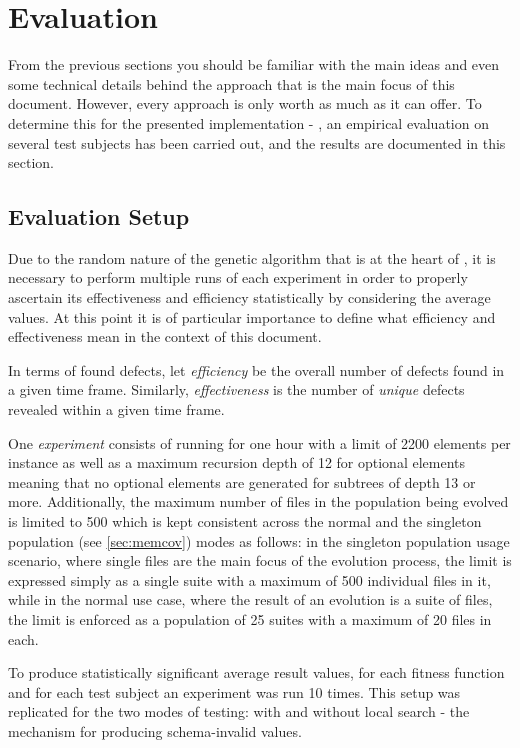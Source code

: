 \section{Evaluation}
\label{sec:evaluation}
From the previous sections you should be familiar with the main ideas and even some technical details behind
the approach that is the main focus of this document. However, every approach is only worth as much as it can
offer. To determine this for the presented implementation - \xmlmate, an empirical evaluation on several test
subjects has been carried out, and the results are documented in this section.
\subsection{Evaluation Setup}

Due to the random nature of the genetic algorithm that is at the heart of \xmlmate, it is necessary to perform
multiple runs of each experiment in order to properly ascertain its effectiveness and efficiency statistically
by considering the average values. At this point it is of particular importance to define what efficiency and
effectiveness mean in the context of this document. 

In terms of found defects, let \emph{efficiency} be the overall number of defects found in a given time frame.
Similarly, \emph{effectiveness} is the number of \emph{unique} defects revealed within a given time frame.

One \emph{experiment} consists of running \xmlmate for one hour with a limit of 2200 elements per \xml instance
as well as a maximum recursion depth of 12 for optional elements meaning that no optional elements are generated
for subtrees of depth 13 or more. Additionally, the maximum number of \xml files in the population being
evolved is limited to 500 which is kept consistent across the normal and the singleton population (see
\cref{sec:memcov}) modes as follows: in the singleton population usage scenario, where single files are the
main focus of the evolution process, the limit is expressed simply as a single suite with a maximum of 500
individual files in it, while in the normal use case, where the result of an evolution is a suite of files, the
limit is enforced as a population of 25 suites with a maximum of 20 files in each.

To produce statistically significant average result values, for each fitness function and for each test
subject an experiment was run 10 times. This setup was replicated for the two modes of testing: with and
without local search - the mechanism for producing schema-invalid values.

